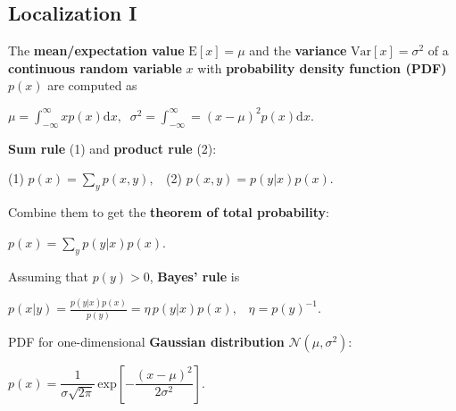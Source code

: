 \documentclass[landscape]{article}
\newcommand{\vmspace}{\vspace{-7pt}}
\newcommand{\vpspace}{\vspace{5pt}}
\begin{document}
\begin{multicols}{3}

\vfill


\section{Localization I}

\vmspace

\begin{minipage}{\columnwidth}
  The \textbf{mean/expectation value} $\mathrm{E}[x] = \mu$ and the
  \textbf{variance} $\mathrm{Var}[x] = \sigma^2$ of a \textbf{continuous random
  variable} $x$ with \textbf{probability density function (PDF)} $p(x)$ are
  computed as
  \vmspace
  \begin{center}
    $\mu = \int_{-\infty}^{\infty}xp(x)\mathrm dx,\;\;
    \sigma^2 = \int_{-\infty}^{\infty} = (x - \mu)^2 p(x)
    \mathrm dx.$
  \end{center}
\end{minipage}

\vpspace

\begin{minipage}{\columnwidth}
  \textbf{Sum rule} (1) and \textbf{product rule} (2):
  \vmspace
  \begin{center}
    (1) $p(x) = \sum_y p(x,y),\;\;$
    (2) $p(x, y) = p(y | x) p(x)$.
  \end{center}
\end{minipage}

\vpspace

\begin{minipage}{\columnwidth}
  Combine them to get the \textbf{theorem of total probability}:
  \vmspace
  \begin{center}
    $p(x) = \sum_y p(y | x) p(x).$
  \end{center}
\end{minipage}

\vpspace

\begin{minipage}{\columnwidth}
  Assuming that $p(y) > 0$, \textbf{Bayes' rule} is
  \vmspace
  \begin{center}
    $p(x|y) = \frac{p(y|x)p(x)}{p(y)} = \eta\, p(y|x)p(x),\;\;\;
    \eta = p(y)^{-1}.$
  \end{center}
\end{minipage}

\vpspace

\begin{minipage}{\columnwidth}
  PDF for one-dimensional \textbf{Gaussian distribution} $\mathcal N (\mu,
  \sigma^2)$:
  \vmspace
  \begin{center}
    $p(x)
    =
    \dfrac{1}{\sigma \sqrt{2\pi}}\,\mathrm{exp}\left[-\dfrac{(x -
    \mu)^2}{2\sigma^2}\right].$
  \end{center}
\end{minipage}


\end{multicols}
\end{document}
